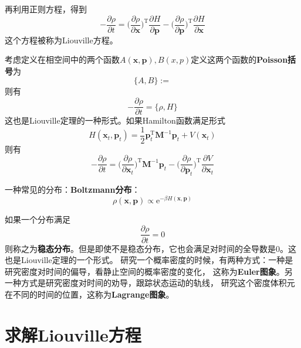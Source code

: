     再利用正则方程，得到
    \begin{equation}
        - \frac {\partial \rho}{\partial t} = \bigg(\frac {\partial \rho}{\partial \bm{x}}\bigg)^\mathrm{T} \frac {\partial H}{\partial \bm{p}} - \bigg(\frac {\partial \rho}{\partial \bm{p}}\bigg)^\mathrm{T} \frac {\partial H}{\partial \bm{x}}
    \end{equation}
    这个方程被称为Liouville方程。
    \par 
    考虑定义在相空间中的两个函数$A(\bm{x}, \bm{p}),B(x ,p)$定义这两个函数的\textbf{Poisson括号}为
    \begin{equation}
        \{A, B\} := 
    \end{equation}
    则有
    \begin{equation*}
        - \frac {\partial \rho}{\partial t} = \{ \rho, H\}
    \end{equation*}
    这也是Liouville定理的一种形式。如果Hamilton函数满足形式
    \begin{equation*}
        H(\bm{x}_t,\bm{p}_t) = \frac 12 \bm{p}_t^\mathrm{T} \bm{M}^{-1} \bm{p}_t + V(\bm{x}_t)
    \end{equation*}
    则有
    \begin{equation*} 
        - \frac {\partial \rho}{\partial t} = \bigg(\frac {\partial \rho}{\partial \bm{x}_t}\bigg)^\mathrm{T} \bm{M}^{-1} \bm{p}_t  - \bigg(\frac {\partial \rho}{\partial \bm{p}_t}\bigg)^\mathrm{T} \frac {\partial V}{\partial \bm{x}_t}
    \end{equation*}

    一种常见的分布：\textbf{Boltzmann分布}：
    \begin{equation*}
        \rho(\bm{x},\bm{p}) \propto \mathrm{e}^{-\beta H(\bm{x},\bm{p})}
    \end{equation*}

    如果一个分布满足
    \begin{equation*}
        \frac {\partial \rho}{\partial t} = 0
    \end{equation*}
    则称之为\textbf{稳态分布}。但是即使不是稳态分布，它也会满足对时间的全导数是0。这也是Liouville定理的一个形式。
    研究一个概率密度的时候，有两种方式：一种是研究密度对时间的偏导，看静止空间的概率密度的变化，
    这称为\textbf{Euler图象}。另一种方式是研究密度对时间的劝导，跟踪状态运动的轨线，
    研究这个密度体积元在不同的时间的位置，这称为\textbf{Lagrange图象}。

    \section{求解Liouville方程}
